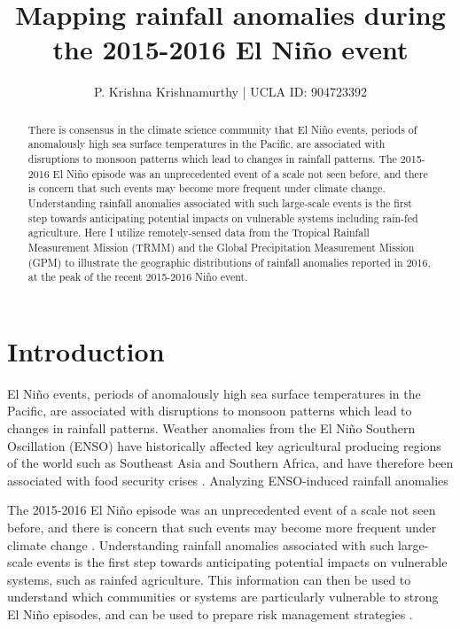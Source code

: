 \documentclass[12pt]{article}
\title{Mapping rainfall anomalies during the 2015-2016 El Ni{\~n}o event}
\author{P. Krishna Krishnamurthy | UCLA ID: 904723392}
\date{}
\begin{document}
\maketitle

\begin{abstract}
There is consensus in the climate science community that El Ni{\~n}o events, periods of anomalously high sea surface temperatures in the Pacific, are associated with disruptions to monsoon patterns which lead to changes in rainfall patterns. The 2015-2016 El Ni{\~n}o episode was an unprecedented event of a scale not seen before, and there is concern that such events may become more frequent under climate change. Understanding rainfall anomalies associated with such large-scale events is the first step towards anticipating potential impacts on vulnerable systems including rain-fed agriculture. Here I utilize remotely-sensed data from the Tropical Rainfall Measurement Mission (TRMM) and the Global Precipitation Measurement Mission (GPM) to illustrate the geographic distributions of rainfall anomalies reported in 2016, at the peak of the recent 2015-2016 Ni{\~n}o event.
\end{abstract}

\section{Introduction}
El Ni{\~n}o events, periods of anomalously high sea surface temperatures in the Pacific, are associated with disruptions to monsoon patterns which lead to changes in rainfall patterns. Weather anomalies from the El Ni{\~n}o Southern Oscillation (ENSO) have historically affected key agricultural producing regions of the world such as Southeast Asia and Southern Africa, and have therefore been associated with food security crises \cite{ray2014effects, iizumi2014impacts}. Analyzing ENSO-induced rainfall anomalies  

The 2015-2016 El Ni{\~n}o episode was an unprecedented event of a scale not seen before, and there is concern that such events may become more frequent under climate change \cite{cai2014increasing}. Understanding rainfall anomalies associated with such large-scale events is the first step towards anticipating potential impacts on vulnerable systems, such as rainfed agriculture. This information can then be used to understand which communities or systems are particularly vulnerable to strong El Ni{\~n}o episodes, and can be used to prepare risk management strategies \cite{wang2017nino}. 
\end{document}
